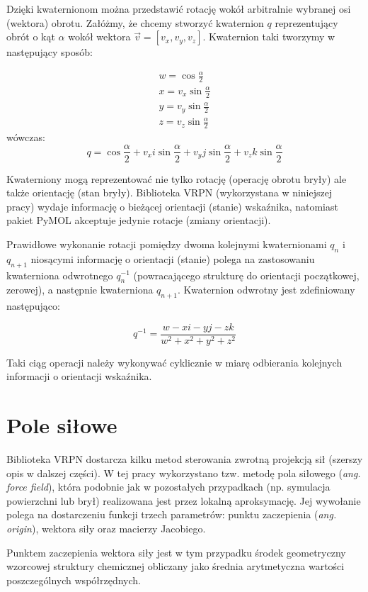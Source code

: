 \documentclass[licencjacka]{pracamgr}
\begin{document}
Dzięki kwaternionom można przedstawić rotację wokół arbitralnie wybranej osi (wektora) obrotu. Załóżmy, że chcemy stworzyć kwaternion $q$ reprezentujący obrót o kąt $\alpha$ wokół wektora $\vec{v}=[v_x,v_y,v_z]$. Kwaternion taki tworzymy w następujący sposób:

$$
\begin{array}{lr}
w=\cos{\frac{\alpha}{2}} \\
x=v_x \sin{\frac{\alpha}{2}} \\
y=v_y \sin{\frac{\alpha}{2}} \\
z=v_z \sin{\frac{\alpha}{2}} 
\end{array}
$$
wówczas:
$$
q=\cos{\frac{\alpha}{2}}+v_xi\sin{\frac{\alpha}{2}}+v_yj\sin{\frac{\alpha}{2}}+v_zk\sin{\frac{\alpha}{2}}
$$

Kwaterniony mogą reprezentować nie tylko rotację (operację obrotu bryły) ale także orientację (stan bryły). Biblioteka VRPN (wykorzystana w niniejszej pracy) wydaje informację o bieżącej orientacji (stanie) wskaźnika, natomiast pakiet PyMOL akceptuje jedynie rotacje (zmiany orientacji).

Prawidłowe wykonanie rotacji pomiędzy dwoma kolejnymi kwaternionami $q_n$ i $q_{n+1}$ niosącymi informację o orientacji (stanie) polega na zastosowaniu kwaterniona odwrotnego $q_n^{-1}$ (powracającego strukturę do orientacji początkowej, zerowej), a następnie kwaterniona $q_{n+1}$. Kwaternion odwrotny jest zdefiniowany następująco:

$$
q^{-1}=\frac{w-xi-yj-zk}{w^2+x^2+y^2+z^2}
$$

Taki ciąg operacji należy wykonywać cyklicznie w miarę odbierania kolejnych informacji o orientacji wskaźnika. 

\section{Pole siłowe}
Biblioteka VRPN dostarcza kilku metod sterowania zwrotną projekcją sił (szerszy opis w dalszej części). W tej pracy wykorzystano tzw. metodę pola siłowego (\textit{ang. force field}), która podobnie jak w pozostałych przypadkach (np. symulacja powierzchni lub brył) realizowana jest przez lokalną aproksymację. Jej wywołanie polega na dostarczeniu funkcji trzech parametrów: punktu zaczepienia (\textit{ang. origin}), wektora siły oraz macierzy Jacobiego.

Punktem zaczepienia wektora siły jest w tym przypadku środek geometryczny wzorcowej struktury chemicznej obliczany jako średnia arytmetyczna wartości poszczególnych współrzędnych.
\end{document}
